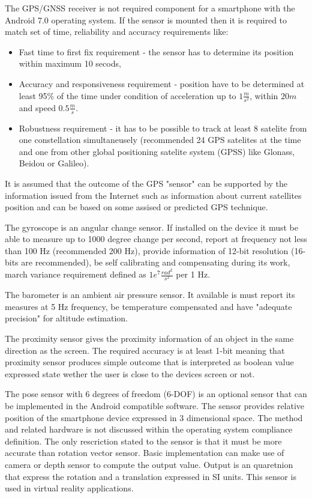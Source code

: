 \documentclass[../main.tex]{subfiles}
\begin{document}
The GPS/GNSS receiver is not required component for a smartphone with the Android 7.0 operating system. If the sensor is mounted then it is required to match set of time, reliability and accuracy requirements like:
\begin{itemize}
	\item Fast time to first fix requirement - the sensor has to determine its position within maximum 10 secods,
	\item Accuracy and responsiveness requirement - position have to be determined at least 95\% of the time under condition of acceleration up to $ 1 \frac{m}{s^2} $, within $ 20 m $ and speed $ 0.5 \frac{m}{s} $.
	\item Robustness requirement - it has to be possible to track at least 8 satelite from one constellation simultaneusely (recommended 24 GPS satelites at the time and one from other global positioning satelite system (GPSS) like Glonass, Beidou or Galileo).
\end{itemize}
It is assumed that the outcome of the GPS "sensor" can be supported by the information issued from the Internet such as information about current satellites position and can be based on some assised or predicted GPS technique.

The gyroscope is an angular change sensor. If installed on the device it must be able to measure up to 1000 degree change per second, report at frequency not less than 100 Hz (recommended 200 Hz), provide information of 12-bit resolution (16-bits are recommended), be self calibrating and compensating during its work, march variance requirement defined as $ 1e^7 \frac{rad^2}{s^2} $ per 1 Hz.

The barometer is an ambient air pressure sensor. It available is must report its measures at 5 Hz frequency, be temperature compensated and have "adequate precision" for altitude estimation.

The proximity sensor gives the proximity information of an object in the same direction as the screen. The required accuracy is at least 1-bit meaning that proximity sensor produces simple outcome that is interpreted as boolean value expressed state wether the user is close to the devices screen or not.

The pose sensor with 6 degrees of freedom (6-DOF) is an optional sensor that can be implemented in the Android compatible software. The sensor provides relative position of the smartphone device expressed in 3 dimensional space. The method and related hardware is not discussed within the operating system compliance definition. The only rescriction stated to the sensor is that it must be more accurate than rotation vector sensor. Basic implementation can make use of camera or depth sensor to compute the output value. Output is an quaretnion that express the rotation and a translation expressed in SI units. This sensor is used in virtual reality applications.
\end{document}
